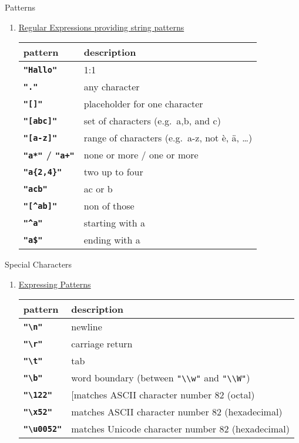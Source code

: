 \documentclass[ignorenonframetext,]{beamer}
\begin{document}
\begin{frame}[fragile]{Patterns}

\begin{enumerate}
\def\labelenumi{\arabic{enumi})}
\setcounter{enumi}{1}
\item
  \href{http://regexlib.com/CheatSheet.aspx}{Regular Expressions
  providing string patterns}

  \begin{longtable}[c]{@{}ll@{}}
  \toprule
  pattern & description\tabularnewline
  \midrule
  \endhead
  \textbf{\texttt{"Hallo"}} & 1:1\tabularnewline
  \textbf{\texttt{"."}} & any character\tabularnewline
  \textbf{\texttt{"{[}{]}"}} & placeholder for one
  character\tabularnewline
  \textbf{\texttt{"{[}abc{]}"}} & set of characters (e.g.~a,b, and
  c)\tabularnewline
  \textbf{\texttt{"{[}a-z{]}"}} & range of characters (e.g.~a-z, not è,
  ä, \ldots{})\tabularnewline
  \textbf{\texttt{"a*"} / \texttt{"a+"}} & none or more / one or
  more\tabularnewline
  \textbf{\texttt{"a\{2,4\}"}} & two up to four\tabularnewline
  \textbf{\texttt{"ac\textbar{}b"}} & ac or b\tabularnewline
  \textbf{\texttt{"{[}\^{}ab{]}"}} & non of those\tabularnewline
  \textbf{\texttt{"\^{}a"}} & starting with a\tabularnewline
  \textbf{\texttt{"a\$"}} & ending with a\tabularnewline
  \bottomrule
  \end{longtable}
\end{enumerate}

\end{frame}

\begin{frame}[fragile]{Special Characters}

\begin{enumerate}
\def\labelenumi{\arabic{enumi})}
\setcounter{enumi}{2}
\item
  \href{http://regexlib.com/CheatSheet.aspx}{Expressing Patterns}

  \begin{longtable}[c]{@{}ll@{}}
  \toprule
  pattern & description\tabularnewline
  \midrule
  \endhead
  \textbf{\texttt{"\textbackslash{}n"}} & newline\tabularnewline
  \textbf{\texttt{"\textbackslash{}r"}} & carriage return\tabularnewline
  \textbf{\texttt{"\textbackslash{}t"}} & tab\tabularnewline
  \textbf{\texttt{"\textbackslash{}b"}} & word boundary (between
  \texttt{"\textbackslash{}\textbackslash{}w"} and
  \texttt{"\textbackslash{}\textbackslash{}W"})\tabularnewline
  \textbf{\texttt{"\textbackslash{}122"}} & {[}matches ASCII character
  number 82 (octal)\tabularnewline
  \textbf{\texttt{"\textbackslash{}x52"}} & matches ASCII character
  number 82 (hexadecimal)\tabularnewline
  \textbf{\texttt{"\textbackslash{}u0052"}} & matches Unicode character
  number 82 (hexadecimal)\tabularnewline
  \bottomrule
  \end{longtable}
\end{enumerate}

\end{frame}
\end{document}
